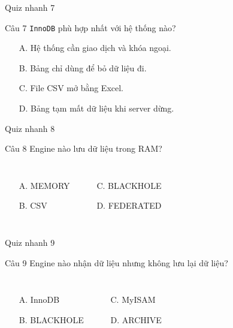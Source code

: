 \documentclass[aspectratio=169,11pt]{beamer}
\newcommand{\code}[1]{\texttt{#1}}
\newcommand{\smallitem}{\setlength{\itemsep}{2pt}}
\begin{document}
\begin{frame}{Quiz nhanh 7}
\begin{block}{Câu 7}
\code{InnoDB} phù hợp nhất với hệ thống nào?
\end{block}
\vspace{0.2cm}
\begin{itemize}\smallitem
  \item[A.] Hệ thống cần giao dịch và khóa ngoại.
  \item[B.] Bảng chỉ dùng để bỏ dữ liệu đi.
  \item[C.] File CSV mở bằng Excel.
  \item[D.] Bảng tạm mất dữ liệu khi server dừng.
\end{itemize}
\end{frame}

\begin{frame}{Quiz nhanh 8}
\begin{block}{Câu 8}
Engine nào lưu dữ liệu trong RAM?
\end{block}
\vspace{0.2cm}
\begin{columns}[T,onlytextwidth]
\begin{itemize}\smallitem
  \item[A.] MEMORY
  \item[B.] CSV
\end{itemize}
\begin{itemize}\smallitem
  \item[C.] BLACKHOLE
  \item[D.] FEDERATED
\end{itemize}
\end{columns}
\end{frame}

\begin{frame}{Quiz nhanh 9}
\begin{block}{Câu 9}
Engine nào nhận dữ liệu nhưng không lưu lại dữ liệu?
\end{block}
\vspace{0.2cm}
\begin{columns}[T,onlytextwidth]
\begin{itemize}\smallitem
  \item[A.] InnoDB
  \item[B.] BLACKHOLE
\end{itemize}
\begin{itemize}\smallitem
  \item[C.] MyISAM
  \item[D.] ARCHIVE
\end{itemize}
\end{columns}
\end{frame}
\end{document}
